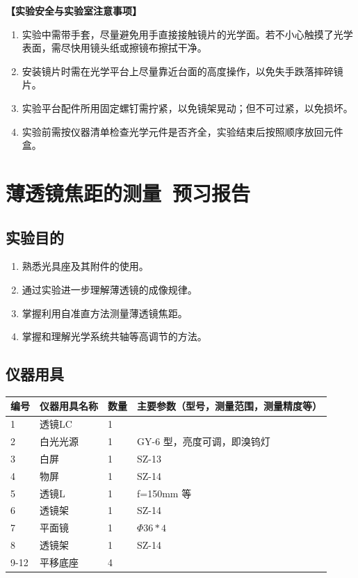 \documentclass[dvipsnames, svgnames,a4paper,11pt]{article}
\begin{document}
\textbf{【实验安全与实验室注意事项】}\\
\begin{enumerate}
    \item 实验中需带手套，尽量避免用手直接接触镜片的光学面。若不小心触摸了光学表面，需尽快用镜头纸或擦镜布擦拭干净。
    \item 安装镜片时需在光学平台上尽量靠近台面的高度操作，以免失手跌落摔碎镜片。
    \item 实验平台配件所用固定螺钉需拧紧，以免镜架晃动；但不可过紧，以免损坏。
    \item 实验前需按仪器清单检查光学元件是否齐全，实验结束后按照顺序放回元件盒。
\end{enumerate}

\clearpage
\tableofcontents
\clearpage

\setcounter{section}{0}
\section{薄透镜焦距的测量\ \textbf{预习报告}}
	
\subsection{实验目的}
\begin{enumerate}
    \item 熟悉光具座及其附件的使用。
	\item 通过实验进一步理解薄透镜的成像规律。
	\item 掌握利用自准直方法测量薄透镜焦距。
	\item 掌握和理解光学系统共轴等高调节的方法。
\end{enumerate}
\subsection{仪器用具}
\begin{table}[htbp]
	\centering
	\renewcommand\arraystretch{1.6}
	\begin{tabular}{p{}|p{}|p{}|p{}}
	\hline
	编号& 仪器用具名称 & 数量 &  主要参数（型号，测量范围，测量精度等） \\
	\hline
	1&透镜LC&1 &\\
	\hline
	2&白光光源&1&GY-6 型，亮度可调，即溴钨灯\\
	\hline
	3&白屏&1&SZ-13\\
	\hline
    4&物屏&1&SZ-14\\
	\hline
    5&透镜L&1&f=150mm 等\\
	\hline
    6&透镜架&1&SZ-14\\
	\hline
    7&平面镜&1&$\Phi36*4$\\
	\hline
    8&透镜架&1&SZ-14\\
	\hline
    9-12&平移底座&4&\\
	\hline
\end{tabular}
\end{table}
\end{document}
